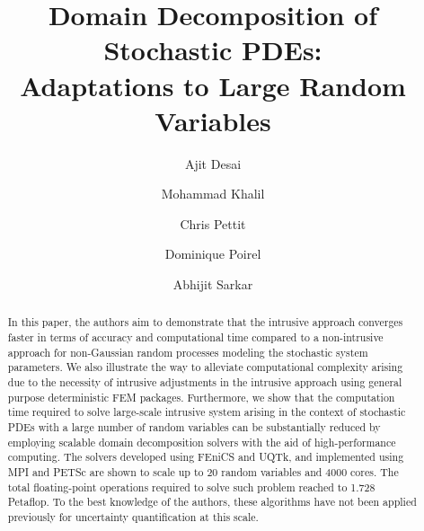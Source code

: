 \documentclass[letter,1p,11pt,oneside,onecolumn,sort&compress]{elsarticle}
\begin{document}
\begin{frontmatter}

\title{Domain Decomposition of Stochastic PDEs: \\ Adaptations to Large Random Variables}
\author[rvt]{Ajit Desai}
\author[san]{Mohammad Khalil}
\author[usn]{Chris Pettit}
\author[els]{Dominique Poirel}
\author[rvt]{Abhijit Sarkar}
\address[rvt]{Department of Civil and Environmental Engineering, Carleton University, Ottawa, Ontario, Canada}
\address[san]{Sandia National Laboratories, Livermore, California, United States}
\address[usn]{Department of Aerospace Engineering, United States Naval Academy, Annapolis, Maryland, United States}
\address[els]{Department of Mechanical and Aerospace Engineering, Royal Military College of Canada, Kingston, Ontario, Canada}



\begin{abstract}
  In this paper, the authors aim to demonstrate that the intrusive approach converges faster in terms of accuracy and computational time compared to a non-intrusive approach for non-Gaussian random processes modeling the stochastic system parameters. %
  We also illustrate the way to alleviate computational complexity arising due to the necessity of intrusive adjustments in the intrusive approach using general purpose deterministic FEM packages.
  Furthermore, we show that the computation time required to solve large-scale intrusive system arising in the context of stochastic PDEs with a large number of random variables can be substantially reduced by employing scalable domain decomposition solvers with the aid of high-performance computing. The solvers developed using FEniCS and UQTk, and implemented using MPI and PETSc are shown to scale up to 20 random variables and 4000 cores. The total floating-point operations required to solve such problem reached to 1.728 Petaflop. To the best knowledge of the authors, these algorithms have not been applied previously for uncertainty quantification at this scale.
\end{abstract}


\end{frontmatter}
\end{document}
